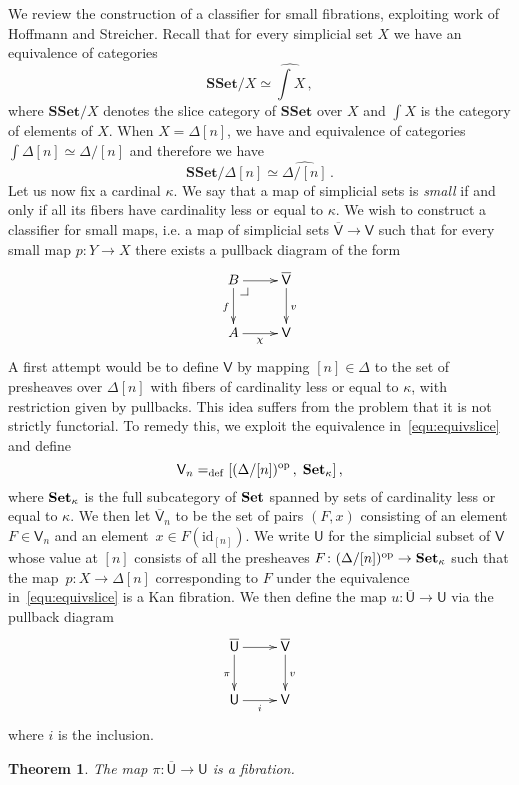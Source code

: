 \documentclass[reqno,10pt,a4paper,oneside]{amsart}
\makeatletter
\newcommand{\drpullback}[1][dr]{\save*!/#1-1.2pc/#1:(-1,1)@^{|-}\restore}
\newtheorem{theorem}{Theorem}[section]
\theoremstyle{definition}
\newcommand{\defeq}{=_{\mathrm{def}}}
\newcommand{\co}{\colon}
\newcommand{\op}{\mathrm{op}}
\newcommand{\SSet}{\mathbf{SSet}}
\newcommand{\UU}{\overline{\mathsf{U}}}
\newcommand{\U}{\mathsf{U}}
\makeatother
\begin{document}
We review the construction of a classifier for small fibrations, exploiting 
work of Hoffmann and Streicher. 
Recall that for every simplicial set $X$ we have an equivalence of categories
\[
\textstyle
\SSet/X \simeq \widehat{\int X} \, ,
\]
where $\SSet/X$ denotes the slice category of $\SSet$ over $X$ and 
$\int X$ is  the category of elements of $X$. When $X = \Delta[n]$,
we have and equivalence of categories $\int \Delta[n] \simeq \Delta /[n]$ and therefore we have
\begin{equation}
\label{equ:equivslice}
\SSet/ \Delta[n] \simeq \widehat{\Delta/[n]} \, .
\end{equation}
Let us now fix a cardinal $\kappa$. We say that a map of simplicial sets is \emph{small} if and only if all its
fibers have cardinality less or equal to $\kappa$. We wish to construct a classifier for small maps,
i.e. a map of  simplicial sets $\overline{\mathsf{V}} \to \mathsf{V}$ such that for every small map $p \co Y \to X$ there 
exists a pullback diagram of the form
\[
\xymatrix{
B \ar[r] \ar[d]_{f} \drpullback & \overline{\mathsf{V}} \ar[d]^{v} \\
A \ar[r]_{\chi} & \mathsf{V}}
\]
A first attempt would be to define $\mathsf{V}$ by mapping $[n] \in \Delta$ to the set of presheaves over $\Delta[n]$
with fibers of cardinality less or equal to $\kappa$, with restriction given by pullbacks. This idea suffers
from the problem that it is not strictly functorial. To remedy this, we exploit the equivalence in~\eqref{equ:equivslice}
and define
\[
\mathsf{V}_n  \defeq [ (\Delta/[n])^\op \, ,  \; \Set_\kappa] \, ,
\]
where $\mathbf{Set}_\kappa$ is the full subcategory of $\mathbf{Set}$ spanned by sets of cardinality less or equal to $\kappa$. We then let $\overline{\mathsf{V}}_n$ to be the set of pairs $(F, x)$ consisting of an element $F \in \mathsf{V}_n$ and an
element~$x \in F(\mathrm{id}_{[n]})$. We write $\U$ 
for the simplicial subset  of $\mathsf{V}$ whose value at $[n]$ consists of all the presheaves $F \co  (\Delta/[n])^\op \to \Set_\kappa$ such that the map~$p \co X \to \Delta[n]$ corresponding to $F$ under the equivalence in~\eqref{equ:equivslice} is a Kan fibration. We then define the map $u \co \UU \to \U$ via the 
pullback diagram
\[
\xymatrix{
\UU \ar[r] \ar[d]_{\pi} &  \overline{\mathsf{V}} \ar[d]^{v}  \\
\U \ar[r]_{i}  & \mathsf{V} }
\]
where $i$ is the inclusion.




\begin{theorem} The map $\pi \co \UU \to \U$ is a fibration.
\end{theorem}
\end{document}
